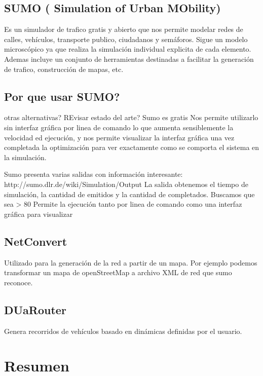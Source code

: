 \subsection{SUMO ( Simulation of Urban MObility)}
Es un simulador de trafico gratis y abierto que nos permite modelar redes de calles, vehículos, transporte publico, ciudadanos y semáforos. Sigue un modelo microscópico ya que realiza la simulación individual explicita de cada elemento. Ademas incluye un conjunto de herramientas destinadas  a facilitar la generación de trafico, construcción de mapas, etc. 


\subsection{Por que usar SUMO? }
otras alternativas? REvisar estado del arte?
Sumo es gratis
Nos permite utilizarlo sin interfaz gráfica por linea de comando lo que aumenta sensiblemente la velocidad ed ejecución, y  nos permite visualizar la interfaz gráfica una vez completada la optimización para ver exactamente como se comporta el sistema en la simulación.

Sumo presenta varias salidas con información interesante: http://sumo.dlr.de/wiki/Simulation/Output 
La salida obtenemos el tiempo de simulación, la cantidad de emitidos y la cantidad de completados. Buscamos que sea > 80%
Permite la ejecución tanto por linea de comando como una interfaz gráfica para visualizar

\subsection{NetConvert}
Utilizado para la generación de la red a partir de un mapa. Por ejemplo podemos transformar un mapa de openStreetMap a archivo XML de red que sumo reconoce.

\subsection{DUaRouter}
 Genera recorridos de vehículos basado en dinámicas definidas por el usuario.



\section{Resumen}

